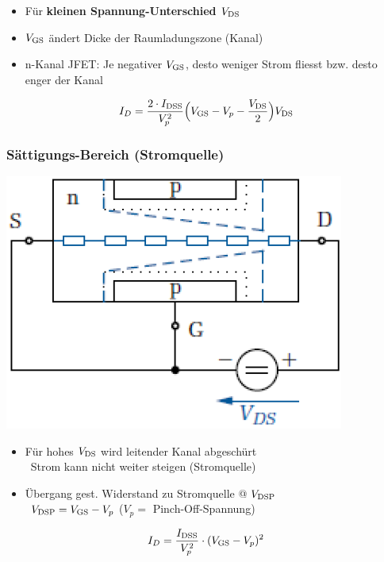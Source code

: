 \begin{minipage}[t]{0.68\columnwidth}
    \begin{itemize}
        \item Für \textbf{kleinen Spannung-Unterschied $V_{\rm DS}$}
        \item $V_{\rm GS}$ ändert Dicke der Raumladungszone (Kanal)
        \item n-Kanal JFET: Je negativer $V_{\rm GS}$, desto weniger Strom fliesst bzw. desto enger der Kanal
    \end{itemize}

    $$  I_D = \frac{2 \cdot I_{\rm DSS}}{V_p^2} \Big( V_{\rm GS} - V_p - \frac{V_{\rm DS}}{2} \Big) V_{\rm DS} $$
\end{minipage}


\subsubsection{Sättigungs-Bereich (Stromquelle)}

\begin{minipage}[t]{0.3\columnwidth}
    \includegraphics[align=t, width=\columnwidth]{images/fet_aufbau_saettigung.png}
\end{minipage}
\hfill
\begin{minipage}[t]{0.68\columnwidth}
    \begin{itemize}
        \item Für hohes $V_{\rm DS}$ wird leitender Kanal abgeschürt \\
            \textrightarrow\ Strom kann nicht weiter steigen (Stromquelle)
        \item Übergang gest. Widerstand zu Stromquelle @ $V_{\rm DSP}$ \\
        \textrightarrow\ $V_{\rm DSP} = V_{\rm GS} - V_p$ ($V_p =$ Pinch-Off-Spannung)
    \end{itemize}

    $$ I_D = \frac{ I_{\rm DSS}}{V_p^2} \cdot ( V_{\rm GS} - V_p )^2 $$
\end{minipage}

